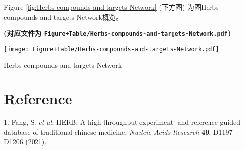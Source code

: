 \documentclass[
]{article}
\newenvironment{cslreferences}%
  {}%
  {\par}
\begin{document}
Figure \ref{fig:Herbs-compounds-and-targets-Network} (下方图) 为图Herbs compounds and targets Network概览。

\textbf{(对应文件为 \texttt{Figure+Table/Herbs-compounds-and-targets-Network.pdf})}

\def\@captype{figure}
\begin{center}
\texttt{[image: Figure+Table/Herbs-compounds-and-targets-Network.pdf]}
\caption{Herbs compounds and targets Network}\label{fig:Herbs-compounds-and-targets-Network}
\end{center}

\hypertarget{bibliography}{%
\section*{Reference}\label{bibliography}}

\hypertarget{refs}{}
\begin{cslreferences}
\leavevmode\hypertarget{ref-HerbAHighThFang2021}{}%
1. Fang, S. \emph{et al.} HERB: A high-throughput experiment- and reference-guided database of traditional chinese medicine. \emph{Nucleic Acids Research} \textbf{49}, D1197--D1206 (2021).
\end{cslreferences}
\end{document}
